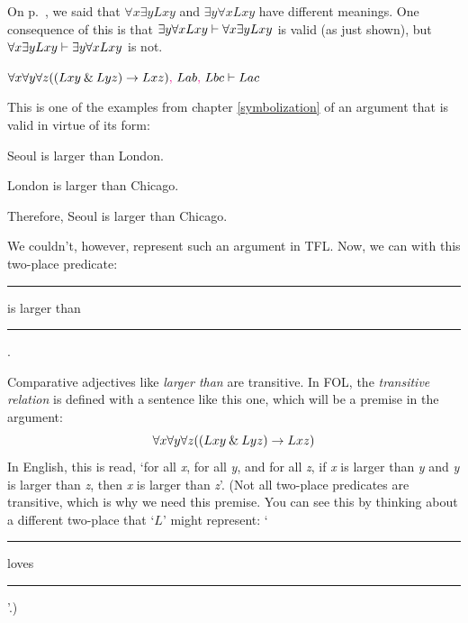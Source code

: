On p.~\pageref{quantifier-order}, we said that $\forall x \exists yLxy$ and $\exists y \forall xLxy$ have different meanings. One consequence of this is that $\exists y \forall xLxy \vdash \forall x \exists yLxy$ is valid (as just shown), but $\forall x \exists yLxy \vdash \exists y \forall xLxy$ is not. 
\medskip



\begin{earg} 
\item[14.] $\forall x \forall y \forall z((Lxy \mathbin{\&} Lyz) \rightarrow Lxz)\textcolor{magenta}{,}~ Lab\textcolor{magenta}{,}~ Lbc \vdash Lac$
\end{earg} 

\noindent\begin{minipage}{0.99\textwidth}
This is one of the examples from chapter \ref{symbolization} of an argument that is valid in virtue of its form:
	\begin{earg}
		\item[1.] Seoul is larger than London.
		\item[2.] London is larger than Chicago.
		\item[3.] Therefore, Seoul is larger than Chicago. 
	\end{earg}
\end{minipage}\bigskip

\noindent We couldn't, however, represent such an argument in TFL. Now, we can with this two-place predicate: 
\begin{ekey}
	\item[L] \rule{1cm}{0.15mm} is larger than \rule{1cm}{0.15mm} .
\end{ekey}
Comparative adjectives like \textit{larger than} are transitive. In FOL, the \textit{transitive relation} is defined with a sentence like this one, which will be a premise in the argument:
$$\forall x \forall y \forall z((Lxy \mathbin{\&} Lyz) \rightarrow Lxz)$$
In English, this is read, `for all \textit{x}, for all \textit{y}, and for all \textit{z}, if \textit{x} is larger than \textit{y} and \textit{y} is larger than \textit{z}, then \textit{x} is larger than \textit{z}'. 
(Not all two-place predicates are transitive, which is why we need this premise. You can see this by thinking about a different two-place that `$L$' might represent: `\rule{1cm}{0.15mm} loves \rule{1cm}{0.15mm}'.)


